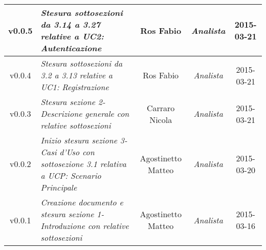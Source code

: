 \begin{table}[h]
	\centering
	\begin{tabular}{|c|p{}|c|c|c|}
		\toprule
		\midrule
		v0.0.5 & \textit{Stesura sottosezioni da 3.14 a 3.27 relative a UC2: Autenticazione} & Ros Fabio & \textit{Analista} & 2015-03-21\\
		\midrule
		v0.0.4 & \textit{Stesura sottosezioni da 3.2 a 3.13 relative a UC1: Registrazione} & Ros Fabio & \textit{Analista} & 2015-03-21\\
		\midrule
		v0.0.3 & \textit{Stesura sezione 2-Descrizione generale con relative sottosezioni} & Carraro Nicola & \textit{Analista} & 2015-03-21\\
		\midrule
		v0.0.2 & \textit{Inizio stesura sezione 3-Casi d'Uso con sottosezione 3.1 relativa a UCP: Scenario Principale} & Agostinetto Matteo & \textit{Analista} & 2015-03-20\\
		\midrule
		v0.0.1 & \textit{Creazione documento e stesura sezione 1-Introduzione con relative sottosezioni} & Agostinetto Matteo & \textit{Analista} & 2015-03-16\\
		\bottomrule
	\end{tabular}
\end{table}
\newpage
